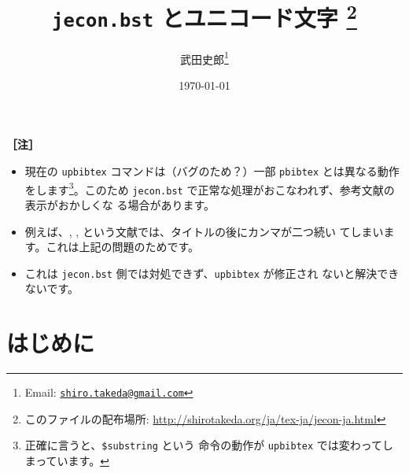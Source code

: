\documentclass[a4paper,10pt]{bxjsarticle}
\title{\textbf{\texttt{jecon.bst} とユニコード文字}
\thanks{このファイルの配布場所: \url{http://shirotakeda.org/ja/tex-ja/jecon-ja.html}}
}
\author{武田史郎\thanks{Email:
\texttt{\href{mailto:shiro.takeda@gmail.com}{shiro.takeda@gmail.com}}}}
\date{\today}
\begin{document}
\maketitle

\tableofcontents


\vspace*{1em}

\textcolor{MyAltColor}{{\Large \textbf{［注］}}}
\begin{itemize}
 \item 現在の \texttt{upbibtex} コマンドは（バグのため？）一部 \texttt{pbibtex}
       とは異なる動作をします\footnote{正確に言うと、\texttt{\$substring} という
       命令の動作が \texttt{upbibtex} では変わってしまっています。}。このため
       \texttt{jecon.bst} で正常な処理がおこなわれず、参考文献の表示がおかしくな
       る場合があります。
 \item 例えば、\citet{naikakufu_2011}, \citet{takeda-gtap-2016ja},
       \citet{chuokankyo06jp:ccs} という文献では、タイトルの後にカンマが二つ続い
       てしまいます。これは上記の問題のためです。
 \item これは \texttt{jecon.bst} 側では対処できず、\texttt{upbibtex} が修正され
       ないと解決できないです。
\end{itemize}

\section{はじめに}
\end{document}
